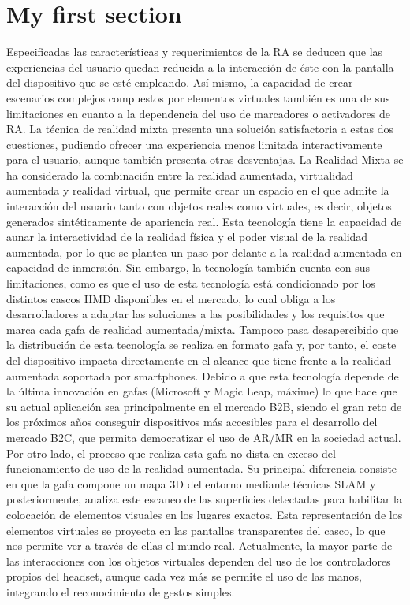 \section{My first section}
Especificadas las características y requerimientos de la RA se deducen que las experiencias del usuario quedan reducida a la interacción de éste con la pantalla del dispositivo que se esté empleando. Así mismo, la capacidad de crear escenarios complejos compuestos por elementos virtuales también es una de sus limitaciones en cuanto a la dependencia del uso de marcadores o activadores de RA. La técnica de realidad mixta presenta una solución satisfactoria a estas dos cuestiones, pudiendo ofrecer una experiencia menos limitada interactivamente para el usuario, aunque también presenta otras desventajas.
La Realidad Mixta se ha considerado la combinación entre la realidad aumentada, virtualidad aumentada y realidad virtual, que permite crear un espacio en el que admite la interacción del usuario tanto con objetos reales como virtuales, es decir, objetos generados sintéticamente de apariencia real. Esta tecnología tiene la capacidad de aunar la interactividad de la realidad física y el poder visual de la realidad aumentada, por lo que se plantea un paso por delante a la realidad aumentada en capacidad de inmersión. Sin embargo, la tecnología también cuenta con sus limitaciones, como es que el uso de esta tecnología está condicionado por los distintos cascos HMD disponibles en el mercado, lo cual obliga a los desarrolladores a adaptar las soluciones a las posibilidades y los requisitos que marca cada gafa de realidad aumentada/mixta. Tampoco pasa desapercibido que la distribución de esta tecnología se realiza en formato gafa y, por tanto, el coste del dispositivo impacta directamente en el alcance que tiene frente a la realidad aumentada soportada por smartphones. Debido a que esta tecnología depende de la última innovación en gafas (Microsoft y Magic Leap, máxime) lo que hace que su actual aplicación sea principalmente en el mercado B2B, siendo el gran reto de los próximos años conseguir dispositivos más accesibles para el desarrollo del mercado B2C, que permita democratizar el uso de AR/MR en la sociedad actual.
Por otro lado, el proceso que realiza esta gafa no dista en exceso del funcionamiento de uso de la realidad aumentada. Su principal diferencia consiste en que la gafa compone un mapa 3D del entorno mediante técnicas SLAM y posteriormente, analiza este escaneo de las superficies detectadas para habilitar la colocación de elementos visuales en los lugares exactos. Esta representación de los elementos virtuales se proyecta en las pantallas transparentes del casco, lo que nos permite ver a través de ellas el mundo real. Actualmente, la mayor parte de las interacciones con los objetos virtuales dependen del uso de los controladores propios del headset, aunque cada vez más se permite el uso de las manos, integrando el reconocimiento de gestos simples.
